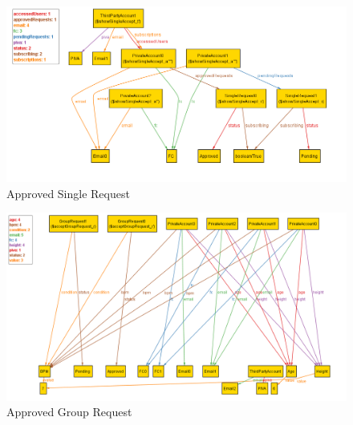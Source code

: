 \documentclass[titlepage]{article}
\begin{document}
		\begin{figure}[H]
			\center
  			\includegraphics[width=\textwidth]{Alloy/singleRequest.png}
			\caption{Approved Single Request}
			\label{fig:sing}
		\end{figure}

		\begin{figure}[H]
			\center
  			\includegraphics[width=\textwidth]{Alloy/groupRequest.png}
			\caption{Approved Group Request}
			\label{fig:groupg}
		\end{figure}
\end{document}
